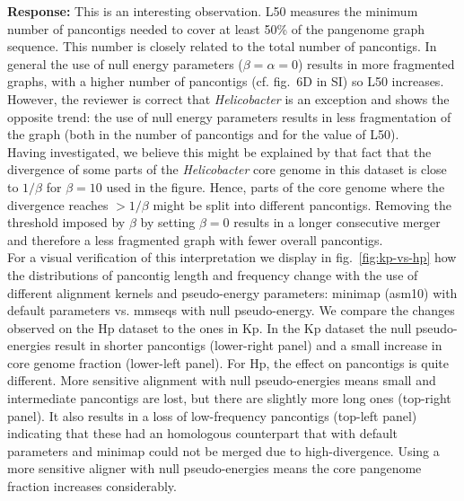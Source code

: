 \documentclass[aps,rmp,onecolumn]{revtex4-1}
\newcommand{\response}[1]{{{\color{response}\textbf{Response:} #1}}\vskip 5mm}
\newcommand{\SIfigBenchmark}{6}
\begin{document}
\response{This is an interesting observation. L50 measures the minimum number of pancontigs needed to cover at least 50\% of the pangenome graph sequence. 
This number is closely related to the total number of pancontigs. 
In general the use of null energy parameters ($\beta=\alpha=0$) results in more fragmented graphs, with a higher number of pancontigs (cf. fig.~{\SIfigBenchmark}D in SI) so L50 increases. 
However, the reviewer is correct that \textit{Helicobacter} is an exception and shows the opposite trend: the use of null energy parameters results in less fragmentation of the graph (both in the number of pancontigs and for the value of L50).\\
Having investigated, we believe this might be explained by that fact that the divergence of some parts of the \textit{Helicobacter} core genome in this dataset is close to $1/\beta$ for $\beta=10$ used in the figure.
Hence, parts of the core genome where the divergence reaches $>1/\beta$ might be split into different pancontigs. 
Removing the threshold imposed by $\beta$ by setting $\beta=0$ results in a longer consecutive merger and therefore a less fragmented graph with fewer overall pancontigs.\\
For a visual verification of this interpretation we display in fig.~\ref{fig:kp-vs-hp} how the distributions of pancontig length and frequency change with the use of different alignment kernels and pseudo-energy parameters: minimap (asm10) with default parameters vs. mmseqs with null pseudo-energy. We compare the changes observed on the Hp dataset to the ones in Kp. 
In the Kp dataset the null pseudo-energies result in shorter pancontigs (lower-right panel) and a small increase in core genome fraction (lower-left panel). 
For Hp, the effect on pancontigs is quite different. More sensitive alignment with null pseudo-energies means small and intermediate pancontigs are lost, but there are slightly more long ones (top-right panel). 
It also results in a loss of low-frequency pancontigs (top-left panel) indicating that these had an homologous counterpart that with default parameters and minimap could not be merged due to high-divergence. Using a more sensitive aligner with null pseudo-energies means the core pangenome fraction increases considerably.  
}
\end{document}
